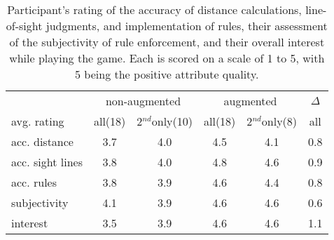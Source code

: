 \begin{table}[tb]
\begin{center}
\begin{tabular}{@{}l|c@{~}c|c@{~}c|c@{}}
                & \multicolumn{2}{c|}{{\small non-augmented}} & \multicolumn{2}{c|}{{\small augmented}} & {\small $\Delta$} \\
{\small avg. rating    } & {\small all(18)} & {\small 2$^{nd}$only(10)} & {\small all(18)} & {\small 2$^{nd}$only(8)} & {\small all} \\ \hline
{\small acc. distance  } & \small 3.7 & \small 4.0 & \small 4.5 & \small 4.1 & \small 0.8 \\
{\small acc. sight lines} & \small 3.8 & \small 4.0 & \small 4.8 & \small 4.6 & \small 0.9 \\
{\small acc. rules     } & \small 3.8 & \small 3.9 & \small 4.6 & \small 4.4 & \small 0.8 \\
{\small subjectivity   } & \small 4.1 & \small 3.9 & \small 4.6 & \small 4.6 & \small 0.6 \\
{\small interest       } & \small 3.5 & \small 3.9 & \small 4.6 & \small 4.6 & \small 1.1 \\
\end{tabular}
\end{center}%
\vspace{-0.05in}
\caption{Participant's rating of the accuracy of distance
  calculations, line-of-sight judgments, and implementation of rules,
  their assessment of the subjectivity of rule enforcement, and their
  overall interest while playing the game.  Each is scored on a scale
  of 1 to 5, with 5 being the positive attribute quality.
\label{table:questionnaire}
\vspace{-0.1in}
}
\end{table}

